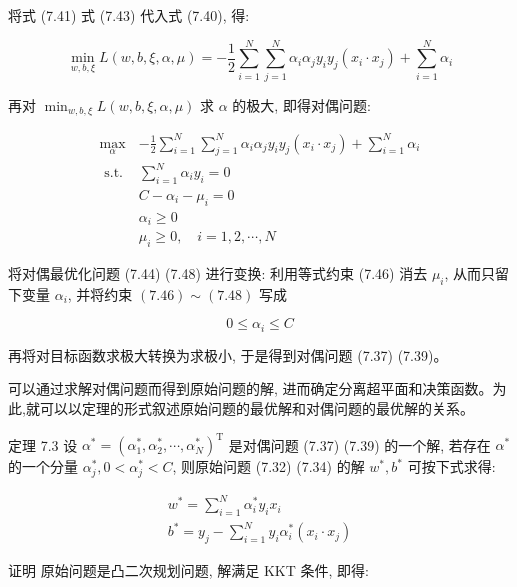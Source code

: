 \documentclass[10pt]{article}
\begin{document}
将式 (7.41) 式 (7.43) 代入式 (7.40), 得:

$$
\min _{w, b, \xi} L(w, b, \xi, \alpha, \mu)=-\frac{1}{2} \sum_{i=1}^{N} \sum_{j=1}^{N} \alpha_{i} \alpha_{j} y_{i} y_{j}\left(x_{i} \cdot x_{j}\right)+\sum_{i=1}^{N} \alpha_{i}
$$

再对 $\min _{w, b, \xi} L(w, b, \xi, \alpha, \mu)$ 求 $\alpha$ 的极大, 即得对偶问题:

\[
\begin{array}{ll}
\max _{\alpha} & -\frac{1}{2} \sum_{i=1}^{N} \sum_{j=1}^{N} \alpha_{i} \alpha_{j} y_{i} y_{j}\left(x_{i} \cdot x_{j}\right)+\sum_{i=1}^{N} \alpha_{i} \\
\text { s.t. } & \sum_{i=1}^{N} \alpha_{i} y_{i}=0 \\
& C-\alpha_{i}-\mu_{i}=0 \\
& \alpha_{i} \geqslant 0 \\
& \mu_{i} \geqslant 0, \quad i=1,2, \cdots, N \tag{7.48}
\end{array}
\]

将对偶最优化问题 (7.44) (7.48) 进行变换: 利用等式约束 (7.46) 消去 $\mu_{i}$, 从而只留下变量 $\alpha_{i}$, 并将约束 $(7.46) \sim(7.48)$ 写成


\begin{equation*}
0 \leqslant \alpha_{i} \leqslant C \tag{7.49}
\end{equation*}


再将对目标函数求极大转换为求极小, 于是得到对偶问题 (7.37) (7.39)。

可以通过求解对偶问题而得到原始问题的解, 进而确定分离超平面和决策函数。为此,就可以以定理的形式叙述原始问题的最优解和对偶问题的最优解的关系。

定理 7.3 设 $\alpha^{*}=\left(\alpha_{1}^{*}, \alpha_{2}^{*}, \cdots, \alpha_{N}^{*}\right)^{\mathrm{T}}$ 是对偶问题 (7.37) (7.39) 的一个解, 若存在 $\alpha^{*}$的一个分量 $\alpha_{j}^{*}, 0<\alpha_{j}^{*}<C$, 则原始问题 (7.32) (7.34) 的解 $w^{*}, b^{*}$ 可按下式求得:


\begin{gather*}
w^{*}=\sum_{i=1}^{N} \alpha_{i}^{*} y_{i} x_{i}  \tag{7.50}\\
b^{*}=y_{j}-\sum_{i=1}^{N} y_{i} \alpha_{i}^{*}\left(x_{i} \cdot x_{j}\right) \tag{7.51}
\end{gather*}


证明 原始问题是凸二次规划问题, 解满足 KKT 条件, 即得:
\end{document}

